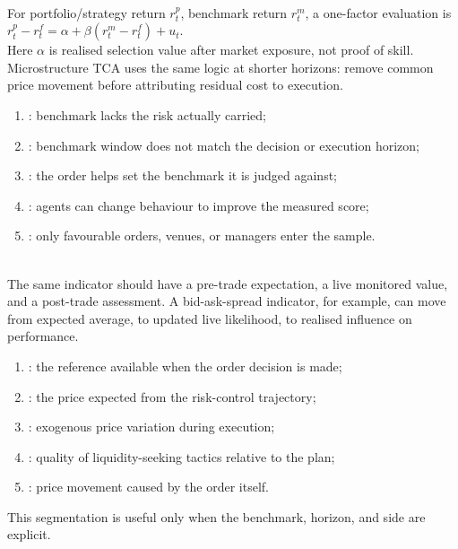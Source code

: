\begin{model} \\
For portfolio/strategy return $r^p_t$, benchmark return $r^m_t$, a one-factor evaluation is $r^p_t-r^f_t=\alpha+\beta(r^m_t-r^f_t)+u_t$.\\
Here $\alpha$ is realised selection value after market exposure, not proof of skill. Microstructure TCA uses the same logic at shorter horizons: remove common price movement before attributing residual cost to execution.
\end{model}

\begin{taxonomy} 
\begin{enumerate}[label=\roman*.]
\setlength{\itemsep}{0pt}
\item {}: benchmark lacks the risk actually carried;
\item {}: benchmark window does not match the decision or execution horizon;
\item {}: the order helps set the benchmark it is judged against;
\item {}: agents can change behaviour to improve the measured score;
\item {}: only favourable orders, venues, or managers enter the sample.
\end{enumerate}
\end{taxonomy}

\begin{principle} \\
The same indicator should have a pre-trade expectation, a live monitored value, and a post-trade assessment. A bid-ask-spread indicator, for example, can move from expected average, to updated live likelihood, to realised influence on performance.
\end{principle}

\begin{taxonomy} 
\begin{enumerate}[label=\roman*.]
\setlength{\itemsep}{0pt}
\item {}: the reference available when the order decision is made;
\item {}: the price expected from the risk-control trajectory;
\item {}: exogenous price variation during execution;
\item {}: quality of liquidity-seeking tactics relative to the plan;
\item {}: price movement caused by the order itself.
\end{enumerate}
This segmentation is useful only when the benchmark, horizon, and side are explicit.
\end{taxonomy}

